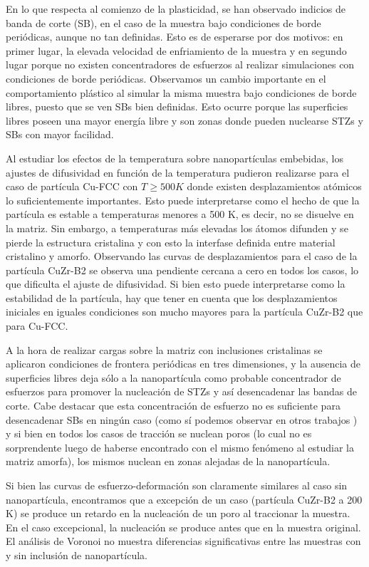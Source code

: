 En lo que respecta al comienzo de la plasticidad, se han observado indicios de banda de corte (SB), en el caso de la muestra bajo condiciones de borde periódicas, aunque no tan definidas. Esto es de esperarse por dos motivos: en primer lugar, la elevada velocidad de enfriamiento de la muestra y en segundo lugar porque no existen concentradores de esfuerzos al realizar simulaciones con condiciones de borde periódicas. Observamos un cambio importante en el comportamiento plástico al simular la misma muestra bajo condiciones de borde libres, puesto que se ven SBs bien definidas. Esto ocurre porque las superficies libres poseen una mayor energía libre y son zonas donde pueden nuclearse STZs y SBs con mayor facilidad.

Al estudiar los efectos de la temperatura sobre nanopartículas embebidas, los ajustes de difusividad en función de la temperatura pudieron realizarse para el caso de partícula Cu-FCC con $T \geq 500 K$ donde existen desplazamientos atómicos lo suficientemente importantes. Esto puede interpretarse como el hecho de que la partícula es estable a temperaturas menores a 500 K, es decir, no se disuelve en la matriz. Sin embargo, a temperaturas más elevadas los átomos difunden y se pierde la estructura cristalina y con esto la interfase definida entre material cristalino y amorfo. Observando las curvas de desplazamientos para el caso de la partícula CuZr-B2 se observa una pendiente cercana a cero en todos los casos, lo que dificulta el ajuste de difusividad. Si bien esto puede interpretarse como la estabilidad de la partícula, hay que tener en cuenta que los desplazamientos iniciales en iguales condiciones son mucho mayores para la partícula CuZr-B2 que para Cu-FCC.

A la hora de realizar cargas sobre la matriz con inclusiones cristalinas se aplicaron condiciones de frontera periódicas en tres dimensiones, y la ausencia de superficies libres deja sólo a la nanopartícula como probable concentrador de esfuerzos para promover la nucleación de STZs y así desencadenar las bandas de corte. Cabe destacar que esta concentración de esfuerzo no es suficiente para desencadenar SBs en ningún caso (como sí podemos observar en otros trabajos \citep{albe13,brink15,adibi13,adibi14}) y si bien en todos los casos de tracción se nuclean poros (lo cual no es sorprendente luego de haberse encontrado con el mismo fenómeno al estudiar la matriz amorfa), los mismos nuclean en zonas alejadas de la nanopartícula.

Si bien las curvas de esfuerzo-deformación son claramente similares al caso sin nanopartícula, encontramos que a excepción de un caso (partícula CuZr-B2 a 200 K) se produce un retardo en la nucleación de un poro al traccionar la muestra. En el caso excepcional, la nucleación se produce antes que en la muestra original. El análisis de Voronoi no muestra diferencias significativas entre las muestras con y sin inclusión de nanopartícula. 

